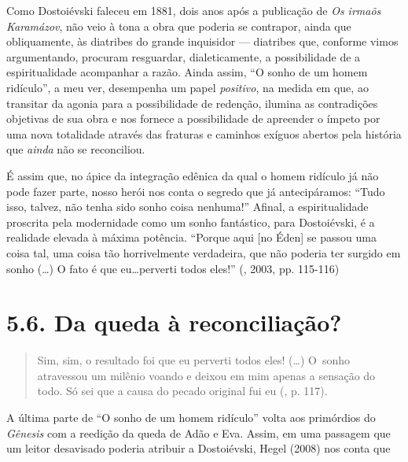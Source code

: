 Como Dostoiévski faleceu em 1881, dois anos após a publicação de
\emph{Os irmaõs Karamázov}, não veio à tona a obra que poderia se
contrapor, ainda que obliquamente, às diatribes do grande inquisidor ---
diatribes que, conforme vimos argumentando, procuram resguardar,
dialeticamente, a possibilidade de a espiritualidade acompanhar a razão.
Ainda assim, ``O sonho de um homem ridículo'', a meu ver, desempenha um
papel \emph{positivo}, na medida em que, ao transitar da agonia para a
possibilidade de redenção, ilumina as contradições objetivas de sua obra
e nos fornece a possibilidade de apreender o ímpeto por uma nova
totalidade através das fraturas e caminhos exíguos abertos pela história
que \emph{ainda} não se reconciliou.

É assim que, no ápice da integração edênica da qual o homem ridículo já
não pode fazer parte, nosso herói nos conta o segredo que já
antecipáramos: ``Tudo isso, talvez, não tenha sido sonho coisa
nenhuma!'' Afinal, a espiritualidade proscrita pela modernidade como um
sonho fantástico, para Dostoiévski, é a realidade elevada à máxima
potência. ``Porque aqui {[}no Éden{]} se passou uma coisa tal, uma coisa
tão horrivelmente verdadeira, que não poderia ter surgido em sonho (\ldots)
O fato é que eu\ldots perverti todos eles!'' (, 2003, pp.
115-116)

\section{5.6. Da queda à reconciliação?}

\begin{quote}
Sim, sim, o resultado foi que eu perverti todos eles! (\ldots) O~sonho
atravessou um milênio voando e deixou em mim apenas a sensação do todo.
Só sei que a causa do pecado original fui eu (, p. 117).
\end{quote}

A última parte de ``O sonho de um homem ridículo'' volta aos primórdios
do \emph{Gênesis} com a reedição da queda de Adão e Eva. Assim, em uma
passagem que um leitor desavisado poderia atribuir a Dostoiévski, Hegel
(2008) nos conta que

